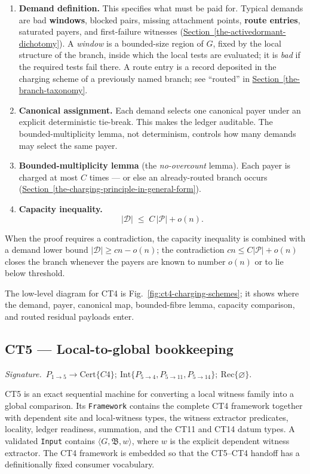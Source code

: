 \documentclass[
  11pt,
]{article}
\providecommand{\tightlist}{%
  \setlength{\itemsep}{0pt}\setlength{\parskip}{0pt}}
\theoremstyle{definition}
\newcommand{\secref}[1]{\hyperref[#1]{Section~\ref*{#1}}}
\newcommand{\ctsignature}[1]{\par\noindent\emph{Signature.}\ #1\par\medskip}
\newcommand{\ctcert}[1]{\mathrm{Cert}\{#1\}}
\newcommand{\ctint}[1]{\mathrm{Int}\{#1\}}
\newcommand{\ctrec}[1]{\mathrm{Rec}\{#1\}}
\newcommand{\ctnone}{\varnothing}
\begin{document}
\begin{enumerate}
\def\labelenumi{\arabic{enumi}.}
\tightlist
\item
  \textbf{Demand definition.} This specifies what must be paid for.
  Typical demands are bad \textbf{windows}, blocked pairs, missing
  attachment points, \textbf{route entries}, saturated payers, and
  first-failure witnesses (\secref{the-activedormant-dichotomy}). A \emph{window} is a bounded-size
  region of \(G\), fixed by the local structure of the branch, inside
  which the local tests are evaluated; it is \emph{bad} if the required
  tests fail there. A route entry is a record deposited in the charging
  scheme of a previously named branch; see ``routed'' in \secref{the-branch-taxonomy}.
\item
  \textbf{Canonical assignment.} Each demand selects one canonical payer
  under an explicit deterministic tie-break. This makes the ledger
  auditable. The bounded-multiplicity lemma, not determinism, controls how
  many demands may select the same payer.
\item
  \textbf{Bounded-multiplicity lemma} (the \emph{no-overcount} lemma).
  Each payer is charged at most \(C\) times --- or else an
  already-routed branch occurs (\secref{the-charging-principle-in-general-form}).
\item
  \textbf{Capacity inequality.} \[
  |\mathcal D| \;\le\; C\,|\mathcal P| + o(n).
  \]
\end{enumerate}

When the proof requires a contradiction, the capacity inequality is
combined with a demand lower bound \(|\mathcal D|\ge cn - o(n)\); the
contradiction \(cn \le C|\mathcal P| + o(n)\) closes the branch whenever
the payers are known to number \(o(n)\) or to lie below threshold.

The low-level diagram for CT4 is Fig.~\ref{fig:ct4-charging-schemes};
it shows where the demand, payer, canonical map, bounded-fibre lemma,
capacity comparison, and routed residual payloads enter.


\subsection{CT5 --- Local-to-global bookkeeping}\label{ct:5}\label{the-local-versus-global-rationale}
\ctsignature{\(P_{1\to5}\to \ctcert{C4};\ \ctint{P_{5\to4},P_{5\to11},P_{5\to14}};\ \ctrec{\ctnone}\).}

CT5 is an exact sequential machine for converting a local witness family into
a global comparison.  Its \texttt{Framework} contains the complete CT4
framework together with dependent site and local-witness types, the witness
extractor predicates, locality, ledger readiness, summation, and the CT11 and
CT14 datum types.  A validated \texttt{Input} contains
\(\langle G,\mathfrak B,w\rangle\), where \(w\) is the explicit dependent
witness extractor.  The CT4 framework is embedded so that the CT5--CT4
handoff has a definitionally fixed consumer vocabulary.
\end{document}
